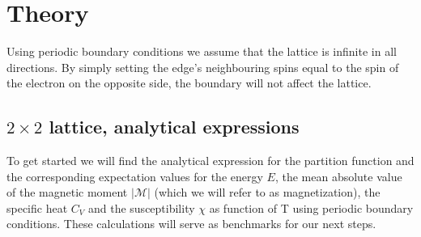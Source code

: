 \documentclass[../main.tex]{subfiles}
\begin{document}
\section{Theory}
Using periodic boundary conditions we assume that the lattice is infinite in all directions. By simply setting the edge's neighbouring spins equal to the spin of the electron on the opposite side, the boundary will not affect the lattice.

\subsection{$2 \times 2$ lattice, analytical expressions} \label{sec:theory-analy}
To get started we will find the analytical expression for the partition function and the corresponding expectation values for the energy $E$, the mean absolute value of the magnetic moment $|\mathcal M|$ (which we will refer to as magnetization), the specific heat $C_V$ and the susceptibility $\chi$ as function of T using periodic boundary conditions. These calculations will serve as benchmarks for our next steps.

\end{document}
